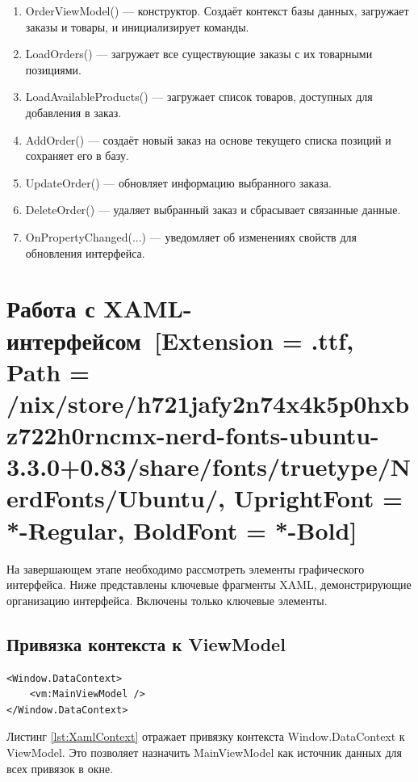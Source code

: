 \documentclass[12pt]{article}
\newcommand{\icon}[1]{\fontspec{UbuntuNerdFont}[Extension = .ttf,
  Path = /nix/store/h721jafy2n74x4k5p0hxbz722h0rncmx-nerd-fonts-ubuntu-3.3.0+0.83/share/fonts/truetype/NerdFonts/Ubuntu/,
  UprightFont = *-Regular,
BoldFont = *-Bold] #1}
\newcommand{\iicon}[1]{{\icon{#1}}}
\renewcommand{\texttt}[1]{{\small\ttfamily #1}}
\newenvironment{code}{\captionsetup{type=listing}}{}
\numberwithin{listing}{section}
\numberwithin{figure}{section}
\begin{document}
\begin{enumerate}
	\item \texttt{OrderViewModel()} — конструктор. Создаёт контекст базы данных, загружает заказы и товары, и инициализирует команды.
	\item \texttt{LoadOrders()} — загружает все существующие заказы с их товарными позициями.
	\item \texttt{LoadAvailableProducts()} — загружает список товаров, доступных для добавления в заказ.
	\item \texttt{AddOrder()} — создаёт новый заказ на основе текущего списка позиций и сохраняет его в базу.
	\item \texttt{UpdateOrder()} — обновляет информацию выбранного заказа.
	\item \texttt{DeleteOrder()} — удаляет выбранный заказ и сбрасывает связанные данные.
	\item \texttt{OnPropertyChanged(...)} — уведомляет об изменениях свойств для обновления интерфейса.
\end{enumerate}

\pagebreak

\section{Работа с XAML-интерфейсом~\texorpdfstring{\iicon{󰗀}}{}}
На завершающем этапе необходимо рассмотреть элементы графического интерфейса. Ниже представлены ключевые фрагменты XAML, демонстрирующие организацию интерфейса.
Включены только ключевые элементы.

\subsection{Привязка контекста к ViewModel}
\begin{code}
	\begin{verbatim}
<Window.DataContext>
    <vm:MainViewModel />
</Window.DataContext>
    \end{verbatim}
	\label{lst:XamlContext}
\end{code}
Листинг \ref{lst:XamlContext} отражает привязку контекста \texttt{Window.DataContext} к ViewModel. Это позволяет назначить \texttt{MainViewModel} как источник данных для всех привязок в окне.
\end{document}
